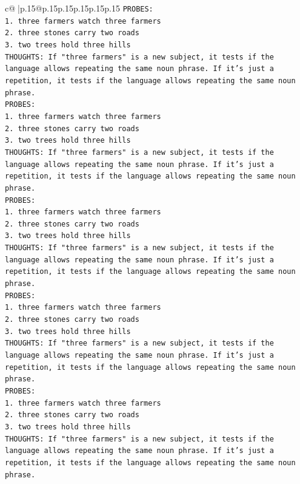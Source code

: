 \documentclass{article}
\begin{document}
{\begin{supertabular}{c@{$\;$}|p{.15\linewidth}@{}p{.15\linewidth}p{.15\linewidth}p{.15\linewidth}p{.15\linewidth}p{.15\linewidth}}
{{{\texttt{PROBES:} \\
\texttt{1. three farmers watch three farmers} \\
\texttt{2. three stones carry two roads} \\
\texttt{3. two trees hold three hills} \\
\texttt{THOUGHTS: If "three farmers" is a new subject, it tests if the language allows repeating the same noun phrase. If it's just a repetition, it tests if the language allows repeating the same noun phrase.} \\
\texttt{PROBES:} \\
\texttt{1. three farmers watch three farmers} \\
\texttt{2. three stones carry two roads} \\
\texttt{3. two trees hold three hills} \\
\texttt{THOUGHTS: If "three farmers" is a new subject, it tests if the language allows repeating the same noun phrase. If it's just a repetition, it tests if the language allows repeating the same noun phrase.} \\
\texttt{PROBES:} \\
\texttt{1. three farmers watch three farmers} \\
\texttt{2. three stones carry two roads} \\
\texttt{3. two trees hold three hills} \\
\texttt{THOUGHTS: If "three farmers" is a new subject, it tests if the language allows repeating the same noun phrase. If it's just a repetition, it tests if the language allows repeating the same noun phrase.} \\
\texttt{PROBES:} \\
\texttt{1. three farmers watch three farmers} \\
\texttt{2. three stones carry two roads} \\
\texttt{3. two trees hold three hills} \\
\texttt{THOUGHTS: If "three farmers" is a new subject, it tests if the language allows repeating the same noun phrase. If it's just a repetition, it tests if the language allows repeating the same noun phrase.} \\
\texttt{PROBES:} \\
\texttt{1. three farmers watch three farmers} \\
\texttt{2. three stones carry two roads} \\
\texttt{3. two trees hold three hills} \\
\texttt{THOUGHTS: If "three farmers" is a new subject, it tests if the language allows repeating the same noun phrase. If it's just a repetition, it tests if the language allows repeating the same noun phrase.} \\
}}}
\end{supertabular}}
\end{document}
